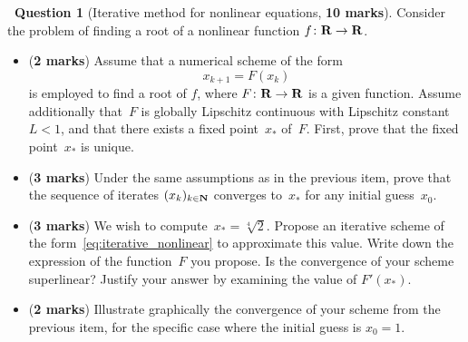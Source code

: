 \documentclass[10pt]{article}
\theoremstyle{definition}
\newtheorem{question}{{\normalfont \faGears}~Question}
\renewcommand{\mymarks}[1]{\textbf{#1 marks}}
\begin{document}
\newpage
\begin{question}
    [Iterative method for nonlinear equations, \textbf{10 marks}]
    Consider the problem of finding a root of a nonlinear function $f \colon \mathbf R \to \mathbf R$.
    \begin{itemize}
        \item (\mymarks{2})
            Assume that a numerical scheme of the form
            \begin{equation}
                \label{eq:iterative_nonlinear}
                x_{k+1} = F(x_k)
            \end{equation}
            is employed to find a root of $f$,
            where $F \colon \mathbf R \to \mathbf R$ is a given function.
            Assume additionally that~$F$ is globally Lipschitz continuous with Lipschitz constant~$L < 1$,
            and that there exists a fixed point~$x_*$ of~$F$.
            First, prove that the fixed point~$x_*$ is unique.
            \vspace{6cm}

        \item
            (\mymarks{3})
            Under the same assumptions as in the previous item,
            prove that the sequence of iterates $(x_k)_{k \in \mathbf N}$ converges to~$x_*$ for any initial guess~$x_0$.
            \vspace{6cm}

        \newpage
        \item
            (\mymarks{3})
            We wish to compute~$x_* = \sqrt[4]{2}$.
            Propose an iterative scheme of the form~\eqref{eq:iterative_nonlinear} to approximate this value.
            Write down the expression of the function~$F$ you propose.
            Is the convergence of your scheme superlinear? Justify your answer by examining the value of $F'(x_*)$.
            \vspace{6cm}

        \item
            (\mymarks{2})
            Illustrate graphically the convergence of your scheme from the previous item,
            for the specific case where the initial guess is $x_0 = 1$.
    \end{itemize}
\end{question}
\end{document}

